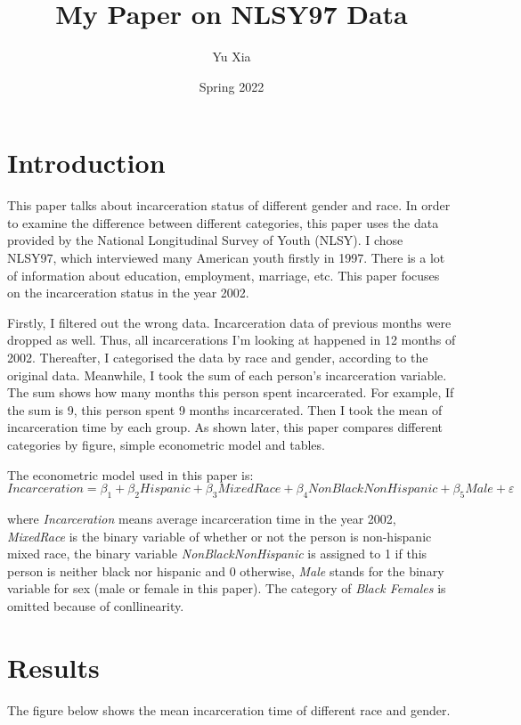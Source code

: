 \documentclass{article}
\author{Yu Xia}
\title{My Paper on NLSY97 Data}
\date{Spring 2022}
\begin{document}
\maketitle

\section{Introduction}

This paper talks about incarceration status of different gender and race. In order to examine the difference between different categories, this paper uses the data provided by the National Longitudinal Survey of Youth (NLSY). I chose NLSY97, which interviewed many American youth firstly in 1997. There is a lot of information about education, employment, marriage, etc. This paper focuses on the incarceration status in the year 2002.

Firstly, I filtered out the wrong data. Incarceration data of previous months were dropped as well. Thus, all incarcerations I'm looking at happened in 12 months of 2002. Thereafter, I categorised the data by race and gender, according to the original data. Meanwhile, I took the sum of each person's incarceration variable. The sum shows how many months this person spent incarcerated. For example, If the sum is 9, this person spent 9 months incarcerated. Then I took the mean of incarceration time by each group. As shown later, this paper compares different categories by figure, simple econometric model and tables. 

The econometric model used in this paper is:
$$
    Incarceration = \beta_1 + \beta_2Hispanic + \beta_3Mixed Race + \beta_4Non Black Non Hispanic + \beta_5Male + \varepsilon
$$

where \textit{Incarceration} means average incarceration time in the year 2002, \textit{MixedRace} is the binary variable of whether or not the person is non-hispanic mixed race, the binary variable \textit{NonBlackNonHispanic} is assigned to 1 if this person is neither black nor hispanic and 0 otherwise, \textit{Male} stands for the binary variable for sex (male or female in this paper). The category of \textit{Black Females} is omitted because of conllinearity. 

\newpage

\section{Results}

The figure below shows the mean incarceration time of different race and gender. 
\end{document}
